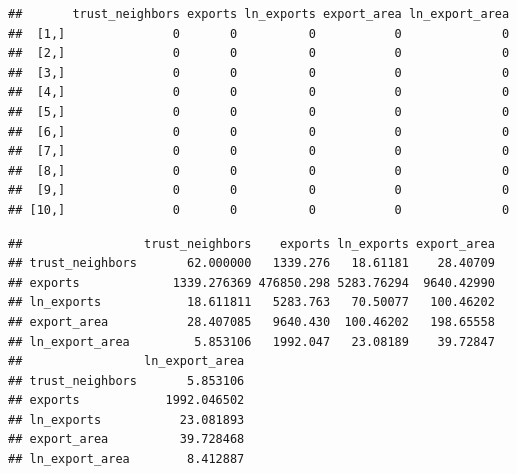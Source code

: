 \documentclass[]{book}
\newenvironment{Shaded}{\begin{snugshade}}{\end{snugshade}}
\newcommand{\CommentTok}[1]{\textcolor[rgb]{0.56,0.35,0.01}{\textit{#1}}}
\newcommand{\DecValTok}[1]{\textcolor[rgb]{0.00,0.00,0.81}{#1}}
\newcommand{\KeywordTok}[1]{\textcolor[rgb]{0.13,0.29,0.53}{\textbf{#1}}}
\newcommand{\NormalTok}[1]{#1}
\newcommand{\OperatorTok}[1]{\textcolor[rgb]{0.81,0.36,0.00}{\textbf{#1}}}
\newcommand{\StringTok}[1]{\textcolor[rgb]{0.31,0.60,0.02}{#1}}
\theoremstyle{definition}
\theoremstyle{definition}
\theoremstyle{definition}
\theoremstyle{remark}
\begin{document}
\begin{Shaded}
\begin{Highlighting}[]
\begin{Shaded}
\begin{Highlighting}[]
\begin{verbatim}
##       trust_neighbors exports ln_exports export_area ln_export_area
##  [1,]               0       0          0           0              0
##  [2,]               0       0          0           0              0
##  [3,]               0       0          0           0              0
##  [4,]               0       0          0           0              0
##  [5,]               0       0          0           0              0
##  [6,]               0       0          0           0              0
##  [7,]               0       0          0           0              0
##  [8,]               0       0          0           0              0
##  [9,]               0       0          0           0              0
## [10,]               0       0          0           0              0
\end{verbatim}

\begin{Shaded}
\end{Shaded}

\begin{verbatim}
##                 trust_neighbors    exports ln_exports export_area
## trust_neighbors       62.000000   1339.276   18.61181    28.40709
## exports             1339.276369 476850.298 5283.76294  9640.42990
## ln_exports            18.611811   5283.763   70.50077   100.46202
## export_area           28.407085   9640.430  100.46202   198.65558
## ln_export_area         5.853106   1992.047   23.08189    39.72847
##                 ln_export_area
## trust_neighbors       5.853106
## exports            1992.046502
## ln_exports           23.081893
## export_area          39.728468
## ln_export_area        8.412887
\end{verbatim}


\end{Highlighting}
\end{Shaded}
\end{Highlighting}
\end{Shaded}
\end{document}

